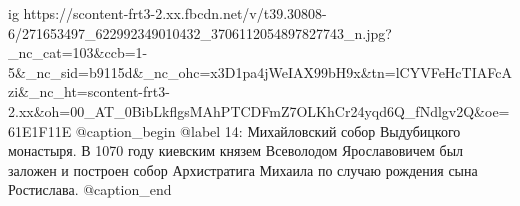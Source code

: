  
 
 
 
 

\ifcmt
  ig https://scontent-frt3-2.xx.fbcdn.net/v/t39.30808-6/271653497_622992349010432_3706112054897827743_n.jpg?_nc_cat=103&ccb=1-5&_nc_sid=b9115d&_nc_ohc=x3D1pa4jWeIAX99bH9x&tn=lCYVFeHcTIAFcAzi&_nc_ht=scontent-frt3-2.xx&oh=00_AT_0BibLkflgsMAhPTCDFmZ7OLKhCr24yqd6Q_fNdlgv2Q&oe=61E1F11E
	@caption_begin
	  @label 14: 
Михайловский собор Выдубицкого монастыря.  В 1070 году киевским князем
Всеволодом Ярославовичем был заложен и построен собор Архистратига Михаила по
случаю рождения сына Ростислава.
	@caption_end
\fi
